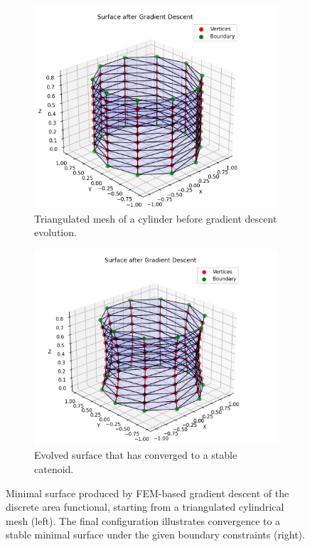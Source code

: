 \begin{figure}[ht]
  \centering
  \begin{subfigure}{0.49\textwidth}
    \centering
    \includegraphics[width=\linewidth]{figures/img1.png}
    \caption{Triangulated mesh of a cylinder before gradient descent evolution.}
    \label{fig:ac-gd-a}
  \end{subfigure}\hfill
  \begin{subfigure}{0.49\textwidth}
    \centering
    \includegraphics[width=\linewidth]{figures/img2.png}
    \caption{Evolved surface that has converged to a stable catenoid.}
    \label{fig:ac-gd-b}
  \end{subfigure}
  \caption{Minimal surface produced by FEM-based gradient descent of the discrete area functional, starting from a triangulated cylindrical mesh (left). The final configuration illustrates convergence to a stable minimal surface under the given boundary constraints (right).}
  \label{fig:ac-gd-side-by-side}
\end{figure}
